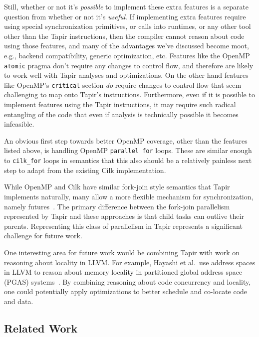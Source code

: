 \documentclass[sigconf]{acmart}
\begin{document}
Still, whether or not it's \emph{possible} to implement these extra features
is a separate question from whether or not it's \emph{useful}. If implementing
extra features require using special synchronization primitives, or calls into
runtimes, or any other tool other than the Tapir instructions, then the
compiler cannot reason about code using those features, and many of the
advantages we've discussed become moot, e.g., backend compatibility, generic 
optimization, etc. Features like the OpenMP \texttt{atomic} pragma don't 
require any changes to control flow, and therefore are likely to work well 
with Tapir analyses and optimizations. On the other hand features like OpenMP's
\texttt{critical} section \emph{do} require changes to control flow that seem
challenging to map onto Tapir's instructions. Furthermore, even if it
is possible to implement features using the Tapir instructions, it may require 
such radical entangling of the code that even if analysis is technically
possible it becomes infeasible. 

An obvious first step towards better OpenMP coverage, other than the features
listed above, is handling OpenMP \texttt{parallel for} loops. These are similar enough
to \texttt{cilk\_for} loops in semantics that this also should be a relatively
painless next step to adapt from the existing Cilk implementation. 

While OpenMP and Cilk have similar fork-join style semantics that Tapir
implements naturally, many allow a more flexible mechanism for synchronization, namely
futures~\cite{qthreads, chapel, hpx}. The primary difference between the
fork-join parallelism represented by Tapir and these approaches is that
child tasks can outlive their parents. Representing this class
of parallelism in Tapir represents a significant challenge for future work.

One interesting area for future work would be combining Tapir with work on
reasoning about locality in LLVM. For example, Hayashi et al.\ 
use address spaces in LLVM to reason about memory
locality in partitioned global address space (PGAS) systems~\cite{hayashi2015llvm}. By combining
reasoning about code concurrency and locality, one could potentially apply
optimizations to better schedule and co-locate code and data.

\subsection{Related Work} \label{Sec:Related}
\end{document}
